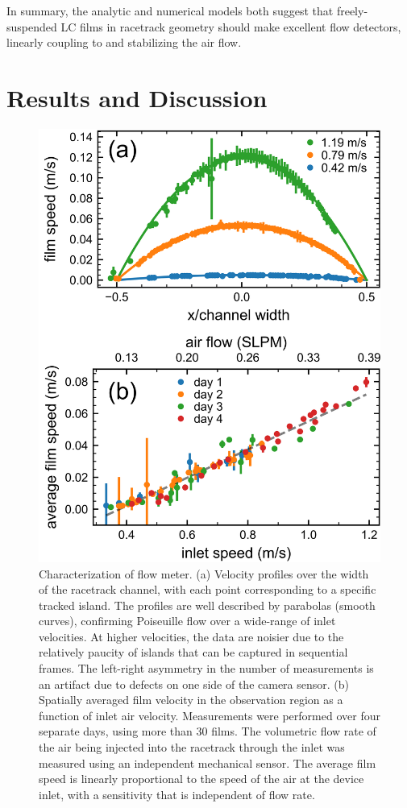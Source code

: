 \documentclass[aagreenthesis]{subfiles}
\begin{document}
In summary, the analytic and numerical models both suggest that freely-suspended LC films in racetrack
geometry should make excellent flow detectors, linearly coupling to and stabilizing the air flow.


\section{Results and Discussion}
\begin{figure}
\centering
\includegraphics[keepaspectratio=true,width=.6\textwidth]{./figs/racetrack/bigfigure/mainresults.png}
\caption{Characterization of flow meter. (a) Velocity profiles over the width
    of the racetrack channel, with each point corresponding to a specific
    tracked island.
    The profiles are well described by parabolas (smooth curves), confirming Poiseuille flow over a
    wide-range of inlet velocities.
    At higher velocities, the data are noisier  due to the relatively paucity of islands that can be captured in sequential frames.
    The left-right asymmetry in the number of measurements is an artifact due to defects on one side of the camera sensor.
    (b) Spatially averaged film
    velocity in the observation region as a function of inlet air velocity. Measurements were performed over four
    separate days, using more than $30$ films. The volumetric flow rate of the
    air being injected into the racetrack through the inlet was measured using an independent
    mechanical sensor.
    The average film speed is linearly proportional to
    the speed of the air at the device inlet, with a sensitivity that is independent of flow rate.
    \label{fig:mainresults}}
\end{figure}
\end{document}

